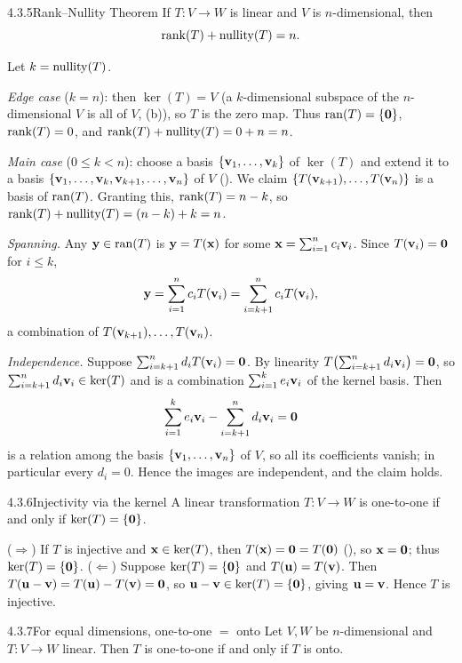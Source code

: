 \begin{thms}{4.3.5}{Rank--Nullity Theorem}
If $T:V\to W$ is linear and $V$ is $n$-dimensional, then
\[
\operatorname{rank}(T)+\operatorname{nullity}(T)=n.
\]
\end{thms}

\begin{prf}
Let $k=\operatorname{nullity}(T)$.

\emph{Edge case} ($k=n$): then $\ker(T)=V$ (a $k$-dimensional subspace of the $n$-dimensional $V$ is all of $V$, (b)), so $T$ is the zero map. Thus $\operatorname{ran}(T)=\{\mathbf{0}\}$, $\operatorname{rank}(T)=0$, and $\operatorname{rank}(T)+\operatorname{nullity}(T)=0+n=n$.

\emph{Main case} ($0\le k<n$): choose a basis $\{\mathbf{v}_1,\dots,\mathbf{v}_k\}$ of $\ker(T)$ and extend it to a basis $\{\mathbf{v}_1,\dots,\mathbf{v}_k,\mathbf{v}_{k+1},\dots,\mathbf{v}_n\}$ of $V$ (). We claim $\{T(\mathbf{v}_{k+1}),\dots,T(\mathbf{v}_n)\}$ is a basis of $\operatorname{ran}(T)$. Granting this, $\operatorname{rank}(T)=n-k$, so $\operatorname{rank}(T)+\operatorname{nullity}(T)=(n-k)+k=n$.

\emph{Spanning.} Any $\mathbf{y}\in\operatorname{ran}(T)$ is $\mathbf{y}=T(\mathbf{x})$ for some $\mathbf{x}=\sum_{i=1}^n c_i\mathbf{v}_i$. Since $T(\mathbf{v}_i)=\mathbf{0}$ for $i\le k$,
\[
\mathbf{y}=\sum_{i=1}^n c_iT(\mathbf{v}_i)=\sum_{i=k+1}^n c_iT(\mathbf{v}_i),
\]
a combination of $T(\mathbf{v}_{k+1}),\dots,T(\mathbf{v}_n)$.

\emph{Independence.} Suppose $\sum_{i=k+1}^n d_iT(\mathbf{v}_i)=\mathbf{0}$. By linearity $T\bigl(\sum_{i=k+1}^n d_i\mathbf{v}_i\bigr)=\mathbf{0}$, so $\sum_{i=k+1}^n d_i\mathbf{v}_i\in\ker(T)$ and is a combination $\sum_{i=1}^k e_i\mathbf{v}_i$ of the kernel basis. Then
\[
\sum_{i=1}^k e_i\mathbf{v}_i-\sum_{i=k+1}^n d_i\mathbf{v}_i=\mathbf{0}
\]
is a relation among the basis $\{\mathbf{v}_1,\dots,\mathbf{v}_n\}$ of $V$, so all its coefficients vanish; in particular every $d_i=0$. Hence the images are independent, and the claim holds.
\end{prf}

\begin{thms}{4.3.6}{Injectivity via the kernel}
A linear transformation $T:V\to W$ is one-to-one if and only if $\ker(T)=\{\mathbf{0}\}$.
\end{thms}

\begin{prf}
($\Rightarrow$) If $T$ is injective and $\mathbf{x}\in\ker(T)$, then $T(\mathbf{x})=\mathbf{0}=T(\mathbf{0})$ (), so $\mathbf{x}=\mathbf{0}$; thus $\ker(T)=\{\mathbf{0}\}$. ($\Leftarrow$) Suppose $\ker(T)=\{\mathbf{0}\}$ and $T(\mathbf{u})=T(\mathbf{v})$. Then $T(\mathbf{u}-\mathbf{v})=T(\mathbf{u})-T(\mathbf{v})=\mathbf{0}$, so $\mathbf{u}-\mathbf{v}\in\ker(T)=\{\mathbf{0}\}$, giving $\mathbf{u}=\mathbf{v}$. Hence $T$ is injective.
\end{prf}

\begin{thms}{4.3.7}{For equal dimensions, one-to-one $=$ onto}
Let $V,W$ be $n$-dimensional and $T:V\to W$ linear. Then $T$ is one-to-one if and only if $T$ is onto.
\end{thms}

